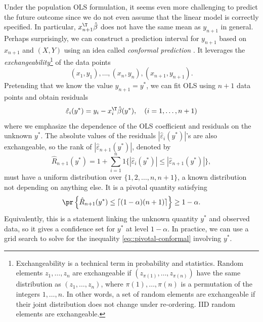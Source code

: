 Under the population OLS formulation, it seems even more challenging to predict the future outcome since we do not even assume that the linear model is correctly specified. In particular, $x_{n+1}^{\T} \hat\beta$ does not have the same mean as $y_{n+1}$ in general. Perhaps surprisingly, we can construct a prediction interval for $y_{n+1}$ based on $x_{n+1}$ and $(X,Y)$ using an idea called {\it conformal prediction} \citep{vovk2005algorithmic, lei2018distribution}. It leverages the {\it exchangeability}\footnote{Exchangeability is a technical term in probability and statistics. Random elements $z_1, \ldots, z_n$ are exchangeable if $(z_{\pi(1)}, \ldots, z_{\pi(n)} ) $ have the same distribution as $(z_1, \ldots, z_n)$, where $\pi(1), \ldots, \pi(n)$ is a permutation of the integers $1,\ldots, n$. In other words, a set of random elements are exchangeable if their joint distribution does not change under re-ordering. IID random elements are exchangeable.} of the data points 
$$
(x_1, y_1),\ldots,  (x_n, y_n), (x_{n+1}, y_{n+1}) .
$$ 
Pretending that we know the value $y_{n+1} = y^*$, we can fit OLS using $n+1$ data points and obtain residuals
$$
\hat{\varepsilon}_i( y^* ) = y_i - x_i^{\T} \hat{\beta}(  y^* ),\quad (i=1,\ldots, n+1)
$$
where we emphasize the dependence of the OLS coefficient and residuals on the unknown $y^*$. 
The absolute values of the residuals $|\hat{\varepsilon}_i(  y^*  )|$'s are also exchangeable, so the rank of $|\hat{\varepsilon}_{n+1}(  y^*  )|$, denoted by 
$$
\hat{R}_{n+1}(  y^*  )  = 1 +  \sum_{i=1}^{n}  1\{    |\hat{\varepsilon}_{i}(  y^*  )| \leq    |\hat{\varepsilon}_{n+1}(  y^*  )|   \}  ,
$$
must have a uniform distribution over $\{ 1, 2, \ldots,n,n+1 \}$, a known distribution not depending on anything else. It is a pivotal quantity satisfying
\begin{eqnarray}\label{eq::pivotal-conformal}
\pr\left\{   \hat{R}_{n+1}(  y^*   )  \leq \lceil  (1-\alpha)(n+1) \rceil \right\} \geq 1-\alpha.
\end{eqnarray}
Equivalently, this is a statement linking the unknown quantity  $y^*$ and observed data, so it gives a confidence set for $y^*$ at level $1-\alpha$. In practice, we can use a grid search to solve for the inequality \eqref{eq::pivotal-conformal} involving $y^*$. 


